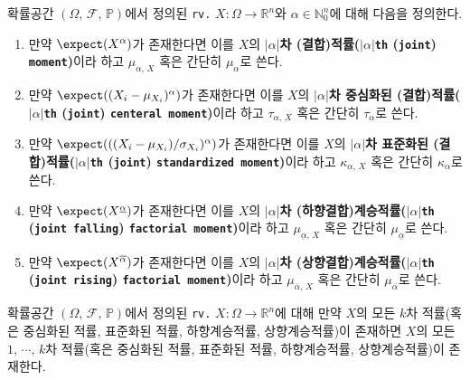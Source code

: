 \begin{definition}
    확률공간 $(\Omega,\,\mathcal{F},\,\mathbb{P})$에서 정의된 \texttt{rv.} $X:\Omega\to\mathbb{R}^n$와 $\alpha\in\mathbb{N}_0^n$에 대해 다음을 정의한다.
    \begin{enumerate}
        \item 만약 $\expect(X^\alpha)$가 존재한다면 이를 $X$의 \textbf{$|\alpha|$차 (결합)적률($|\alpha|$\texttt{th} (\texttt{joint}) \texttt{moment})}이라 하고 $\mu_{\alpha,\,X}$ 혹은 간단히 $\mu_\alpha$로 쓴다.
        \item 만약 $\expect((X_i-\mu_{X_i})^\alpha)$가 존재한다면 이를 $X$의 \textbf{$|\alpha|$차 중심화된 (결합)적률($|\alpha|$\texttt{th} (\texttt{joint}) \texttt{centeral moment})}이라 하고 $\tau_{\alpha,\,X}$ 혹은 간단히 $\tau_\alpha$로 쓴다.
        \item 만약 $\expect(((X_i-\mu_{X_i})/\sigma_{X_i})^\alpha)$가 존재한다면 이를 $X$의 \textbf{$|\alpha|$차 표준화된 (결합)적률($|\alpha|$\texttt{th} (\texttt{joint}) \texttt{standardized moment})}이라 하고 $\kappa_{\alpha,\,X}$ 혹은 간단히 $\kappa_\alpha$로 쓴다.
        \item 만약 $\expect(X^{\underline{\alpha}})$가 존재한다면 이를 $X$의 \textbf{$|\alpha|$차 (하향결합)계승적률($|\alpha|$\texttt{th} (\texttt{joint falling}) \texttt{factorial moment})}이라 하고 $\mu_{\underline{\alpha},\,X}$ 혹은 간단히 $\mu_{\underline{\alpha}}$로 쓴다.
        \item 만약 $\expect(X^{\overline{\alpha}})$가 존재한다면 이를 $X$의 \textbf{$|\alpha|$차 (상향결합)계승적률($|\alpha|$\texttt{th} (\texttt{joint rising}) \texttt{factorial moment})}이라 하고 $\mu_{\overline{\alpha},\,X}$ 혹은 간단히 $\mu_{\overline{\alpha}}$로 쓴다.
    \end{enumerate}
\end{definition}

\begin{proposition}\label{prop:lowerJointMomentExist}
    확률공간 $(\Omega,\,\mathcal{F},\,\mathbb{P})$에서 정의된 \texttt{rv.} $X:\Omega\to\mathbb{R}^n$에 대해 만약 $X$의 모든 $k$차 적률(혹은 중심화된 적률, 표준화된 적률, 하향계승적률, 상향계승적률)이 존재하면 $X$의 모든 $1,\,\cdots,\,k$차 적률(혹은 중심화된 적률, 표준화된 적률, 하향계승적률, 상향계승적률)이 존재한다.
\end{proposition}

